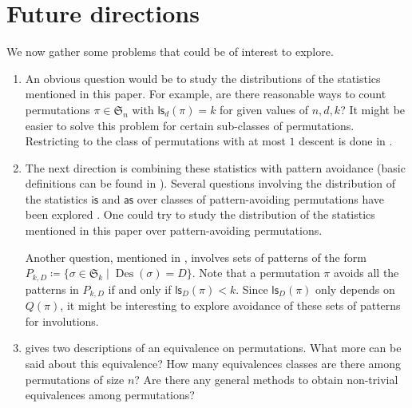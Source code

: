 \documentclass[12pt]{article}
\newcommand{\is}{\mathsf{is}}
\newcommand{\ls}{\mathsf{ls}}
\newcommand{\as}{\mathsf{as}}
\newcommand{\Des}{\operatorname{Des}}
\newcommand{\s}{\mathfrak{S}}
\theoremstyle{definition}
\begin{document}




\section{Future directions}\label{sec:fd}

We now gather some problems that could be of interest to explore.

\begin{enumerate}
    \item An obvious question would be to study the distributions of the statistics mentioned in this paper. 
    For example, are there reasonable ways to count permutations $\pi \in \s_n$ with $\ls_d(\pi) = k$ for given values of $n, d, k$? 
    It might be easier to solve this problem for certain sub-classes of permutations. 
    Restricting to the class of permutations with at most $1$ descent is done in \cite{grass}.

    \item The next direction is combining these statistics with pattern avoidance (basic definitions can be found in \cite[Chapter 4]{bona_book}). 
    Several questions involving the distribution of the statistics $\is$ and $\as$ over classes of pattern-avoiding permutations have been explored \cite{isav,asav,isasav}. 
    One could try to study the distribution of the statistics mentioned in this paper over pattern-avoiding permutations.
    
    Another question, mentioned in \cite[Section 5.3]{stan_as}, involves sets of patterns of the form $P_{k, D} \coloneqq \{\sigma \in \s_k \mid \Des(\sigma) = D\}$. 
    Note that a permutation $\pi$ avoids all the patterns in $P_{k, D}$ if and only if $\ls_D(\pi) < k$. 
    Since $\ls_D(\pi)$ only depends on $Q(\pi)$, it might be interesting to explore avoidance of these sets of patterns for involutions.

    \item {} gives two descriptions of an equivalence on permutations. 
    What more can be said about this equivalence? 
    How many equivalences classes are there among permutations of size $n$? 
    Are there any general methods to obtain non-trivial equivalences among permutations?
\end{enumerate}
\end{document}
